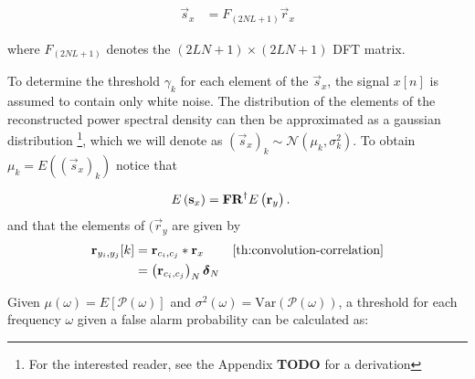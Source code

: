 \documentclass[a4paper, openany, oneside]{memoir}
\begin{document}
\begin{align}
\vec{s}_x &= F_{(2NL+1)}\vec{r}_x
\end{align}

where $F_{(2NL+1)}$ denotes the $(2LN+1)\times (2LN+1)$ DFT matrix. 

To determine the threshold $\gamma_{k}$ for each element of the $\vec{s}_x$, the signal $x[n]$ is assumed to contain only white noise. The distribution of the elements of the reconstructed power spectral density can then be approximated as a gaussian distribution \footnote{For the interested reader, see the Appendix \textbf{TODO} for a derivation}, which we will denote as $(\vec{s}_x)_k \sim \mathcal{N}(\mu_k, \sigma_k^2)$.
To obtain $\mu_k = E\left((\vec{s}_x)_k\right)$ notice that

\begin{align*}
E\left(\boldsymbol{\mathbf{s}}_x\right) &= \boldsymbol{\mathbf{F}}\boldsymbol{\mathbf{R}}^{\dagger}E\left(\boldsymbol{\mathbf{r}}_y\right).
\end{align*} and that the elements of $(\vec{r}_y$ are given by 
\begin{align*}
\vec{r}_{y_i, y_j}[k] &= \vec{r}_{c_i,c_j} \ast \vec{r}_x & \text{\cref{th:convolution-correlation}} \\
&=  \left( \vec{r}_{c_i,c_j}\right)_N  \vec{\delta}_N
\end{align*}









Given $\mu (\omega) = E[\mathcal{P}(\omega)]$ and $\sigma^2 (\omega) = \text{Var}(\mathcal{P}(\omega))$, a threshold for each frequency $\omega$ given a false alarm probability can be calculated as:
\end{document}

